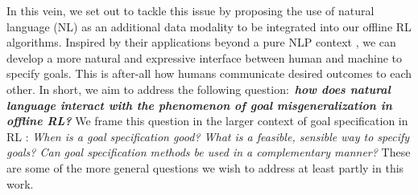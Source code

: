 \documentclass[../thesis-proposal/main.tex]{subfiles}
\begin{document}
In this vein, we set out to tackle this issue by proposing the use of natural language (NL) as an
additional data modality to be integrated into our offline RL algorithms. Inspired by their
applications beyond a pure NLP context \citep{dosovitskiy_image_2022, ramesh_hierarchical_2022,
rombach_high-resolution_2022}, we can develop a more natural and expressive interface between human
and machine to specify goals. This is after-all how humans communicate desired outcomes to each
other. In short, we aim to address the following question:~\textit{\textbf{how does natural language
interact with the phenomenon of goal misgeneralization in offline RL?}} We frame this question in
the larger context of goal specification in RL \citep{white_unifying_2017, liu_goal-conditioned_2022, 
bansal_specification-guided_2022}: \textit{When is a goal specification good? What is a feasible,
sensible way to specify goals? Can goal specification methods be used in a complementary manner?}
These are some of the more general questions we wish to address at least partly in this work.

\ifSubfilesClassLoaded{%
  
}{}
\end{document}
